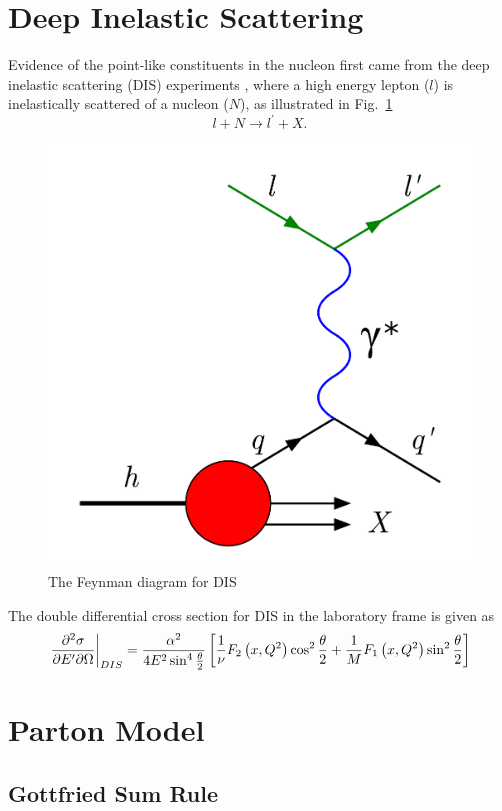 \section {Deep Inelastic Scattering}
\label{sec:dis}
Evidence of the point-like constituents in the nucleon first came from the deep
inelastic scattering (DIS) experiments \cite{breidenbach1969}, where a high 
energy lepton ($l$) is inelastically scattered of a nucleon ($N$), as 
illustrated in Fig.\ \ref{fig:DIS}
\begin{equation}
	l + N \rightarrow l^\prime + X.
\end{equation}
\begin{figure}[htbp!]
    \centering
    \includegraphics[width=0.5\linewidth]{./images/DIS}
    \caption{The Feynman diagram for DIS}
    \label{fig:DIS}
\end{figure}
The double differential cross section for DIS in the laboratory frame is given 
as
\begin{equation}
	\eval{\pdv{\sigma}{E^\prime}{\Omega}}_{DIS} = \frac{\alpha^2}{4E^2 \sin^4 
	\frac{\theta}{2}} \left[ \frac{1}{\nu}F_2\left(x,Q^2\right)\cos^2
	\frac{\theta}{2} + \frac{1}{M} F_1\left(x,Q^2\right)\sin^2 \frac{\theta}{2}
	\right]
\end{equation}





\section{Parton Model}
\label{sec:parton}

\subsection{Gottfried Sum Rule}
\label{sec:gottfried}

